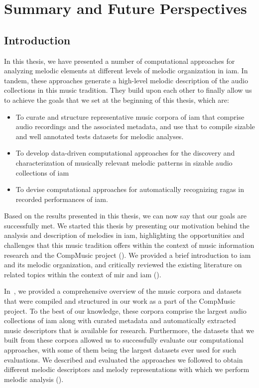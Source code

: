 \chapter{Summary and Future Perspectives}
\label{chap:summary_future_work}

\section{Introduction}
\label{sec:summary_thesis}

In this thesis, we have presented a number of computational approaches for analyzing melodic elements at different levels of melodic organization in \gls{iam}. In tandem, these approaches generate a high-level melodic description of the audio collections in this music tradition. They build upon each other to finally allow us to achieve the goals that we set at the beginning of this thesis, which are: 

\begin{itemize}
	\item To curate and structure representative music corpora of \gls{iam} that comprise audio recordings and the associated metadata, and use that to compile sizable and well annotated tests datasets for melodic analyses.
	\item To develop data-driven computational approaches for the discovery and characterization of musically relevant melodic patterns in sizable audio collections of \gls{iam}
	\item To devise computational approaches for automatically recognizing \glspl{raga} in recorded performances of \gls{iam}.
\end{itemize}

Based on the results presented in this thesis, we can now say that our goals are successfully met. We started this thesis by presenting our motivation behind the analysis and description of melodies in \gls{iam}, highlighting the opportunities and challenges that this music tradition offers within the context of music information research and the CompMusic project (). We provided a brief introduction to \gls{iam} and its melodic organization, and critically reviewed the existing literature on related topics within the context of \gls{mir} and \gls{iam} ().

In~, we provided a comprehensive overview of the music corpora and datasets that were compiled and structured in our work as a part of the CompMusic project. To the best of our knowledge, these corpora comprise the largest audio collections of \gls{iam} along with curated metadata and automatically extracted music descriptors that is available for research. Furthermore, the datasets that we built from these corpora allowed us to successfully evaluate our computational approaches, with some of them being the largest datasets ever used for such evaluations. We described and evaluated the approaches we followed to obtain different melodic descriptors and melody representations with which we perform melodic analysis ().

